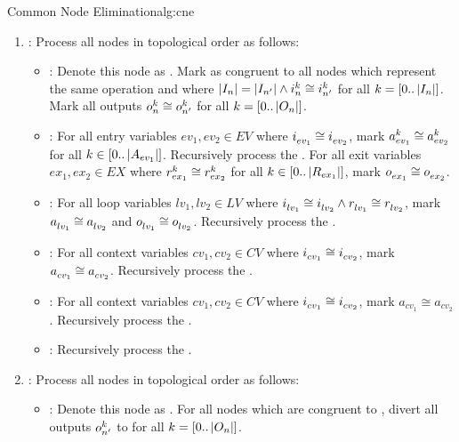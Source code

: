 \begin{informalg}{Common Node Elimination}{alg:cne}
\begin{enumerate}
	\vspace*{-0.7\baselineskip}

	\item {}: Process all nodes in topological order as follows:
		\begin{itemize}
			\item {}: Denote this node as \n. Mark \n as congruent to all nodes
				\np which represent the same operation and where $\card{I_n} = \card{I_{n^{\prime}}} \land
				\iput{k}{n} \cong \iput{k}{n^{\prime}}$ for all $k = [0..\card{I_n}]$. Mark all outputs
				$\oput{k}{n} \cong \oput{k}{n^{\prime}}$ for all $k = [0..\card{O_n}]$.

			\item \bpoint{\gammanode}: For all entry variables $ev_1, ev_2 \in EV$ where
				$\iput{}{ev_1} \cong \iput{}{ev_2}$, mark $\argument{k}{ev_1} \cong \argument{k}{ev_2}$ for
				all $k \in [0..\card{A_{ev_1}}]$. Recursively process the \gammaregions. For all exit
				variables $ex_1, ex_2 \in EX$ where $\result{k}{ex_1} \cong \result{k}{ex_2}$ for all
				$k \in [0..\card{R_{ex_1}}]$, mark $\oput{}{ex_1} \cong \oput{}{ex_2}$.

			\item \bpoint{\thetanode}: For all loop variables $lv_1, lv_2 \in LV$ where
				$\iput{}{lv_1} \cong \iput{}{lv_2} \land \result{}{lv_1} \cong \result{}{lv_2}$, mark
				$\argument{}{lv_1} \cong \argument{}{lv_2}$ and $\oput{}{lv_1} \cong \oput{}{lv_2}$.
				Recursively process the \thetaregion.

			\item \bpoint{\lambdanode}: For all context variables $cv_1, cv_2 \in CV$ where
				$\iput{}{cv_1} \cong \iput{}{cv_2}$, mark $\argument{}{cv_1} \cong \argument{}{cv_2}$.
				Recursively process the \lambdaregion.

			\item \bpoint{\phinode}: For all context variables $cv_1, cv_2 \in CV$ where
				$\iput{}{cv_1} \cong \iput{}{cv_2}$, mark $a_{cv_1} \cong a_{cv_2}$. Recursively process
				the \phiregion.

			\item \bpoint{\omeganode}: Recursively process the \omegaregion.
		\end{itemize}

	\item {}: Process all nodes in topological order as follows:
		\begin{itemize}
			\item {}: Denote this node as \n. For all nodes \np which are congruent to
				\n, divert all outputs $\oput{k}{n^{\prime}}$ to  for all $k = [0..\card{O_n}]$.


\end{itemize}
\end{enumerate}
\end{informalg}
